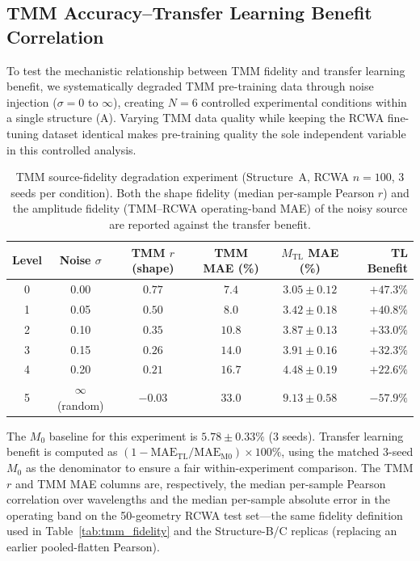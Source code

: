 \documentclass[a4paper,fleqn]{cas-sc}
\newcommand{\Mzero}{M_0}
\newcommand{\Mtl}{M_\text{TL}}
\newcommand{\MAE}{\text{MAE}}
\begin{document}
\subsection{TMM Accuracy--Transfer Learning Benefit Correlation}
\label{sec:tmm_accuracy}

To test the mechanistic relationship between TMM fidelity and transfer learning benefit, we systematically degraded TMM pre-training data through noise injection ($\sigma = 0$ to $\infty$), creating $N=6$ controlled experimental conditions within a single structure (A). Varying TMM data quality while keeping the RCWA fine-tuning dataset identical makes pre-training quality the sole independent variable in this controlled analysis.

\begin{table}[htbp]\centering\small
\caption{TMM source-fidelity degradation experiment (Structure~A, RCWA $n=100$, 3 seeds per condition). Both the shape fidelity (median per-sample Pearson $r$) and the amplitude fidelity (TMM--RCWA operating-band MAE) of the noisy source are reported against the transfer benefit.}
\label{tab:tmm_noise}
\begin{tabular}{cccccr}\toprule
\textbf{Level} & \textbf{Noise $\sigma$} & \textbf{TMM $r$ (shape)} & \textbf{TMM MAE (\%)} & $\Mtl$ \textbf{MAE (\%)} & \textbf{TL Benefit}\\\midrule
0 & 0.00 & $0.77$ & $7.4$ & $3.05 \pm 0.12$ & $+47.3\%$\\
1 & 0.05 & $0.50$ & $8.0$ & $3.42 \pm 0.18$ & $+40.8\%$\\
2 & 0.10 & $0.35$ & $10.8$ & $3.87 \pm 0.13$ & $+33.0\%$\\
3 & 0.15 & $0.26$ & $14.0$ & $3.91 \pm 0.16$ & $+32.3\%$\\
4 & 0.20 & $0.21$ & $16.7$ & $4.48 \pm 0.19$ & $+22.6\%$\\
5 & $\infty$ (random) & $-0.03$ & $33.0$ & $9.13 \pm 0.58$ & $-57.9\%$\\
\bottomrule
\end{tabular}
\end{table}

The $\Mzero$ baseline for this experiment is $5.78 \pm 0.33\%$ (3 seeds). Transfer learning benefit is computed as $(1 - \MAE_\text{TL} / \MAE_\text{M0}) \times 100\%$, using the matched 3-seed $\Mzero$ as the denominator to ensure a fair within-experiment comparison. The TMM $r$ and TMM MAE columns are, respectively, the median per-sample Pearson correlation over wavelengths and the median per-sample absolute error in the operating band on the 50-geometry RCWA test set---the same fidelity definition used in Table~\ref{tab:tmm_fidelity} and the Structure-B/C replicas (replacing an earlier pooled-flatten Pearson).
\end{document}
